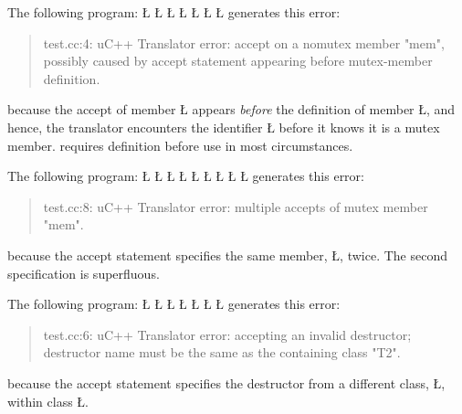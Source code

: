 \documentclass[openright,twoside]{report}
\begin{document}
The following program:
\LGinlinefalse\LGbegin\lgrinde
\L{}
\L{\LB{}}
\L{\LB{}}
\L{\LB{}}
\L{}
\L{\LB{}}
\L{\LB{\};}}
\endlgrinde\LGend
generates this error:
\begin{quote}
\BGfont
test.cc:4: uC++ Translator error: accept on a nomutex member "mem", possibly caused by accept statement appearing before mutex-member definition.
\end{quote}
because the accept of member \LGinlinetrue\LGbegin\lgrinde\L{}\endlgrinde\LGend{} appears \emph{before} the definition of member \LGinlinetrue\LGbegin\lgrinde\L{}\endlgrinde\LGend{}, and hence, the \uC translator encounters the identifier \LGinlinetrue\LGbegin\lgrinde\L{}\endlgrinde\LGend{} before it knows it is a mutex member.
\CC requires definition before use in most circumstances.

The following program:
\LGinlinefalse\LGbegin\lgrinde
\L{}
\L{}
\L{\LB{}}
\L{}
\L{\LB{}}
\L{\LB{}}
\L{\LB{}}
\L{\LB{}}
\L{\LB{\};}}
\endlgrinde\LGend
generates this error:
\begin{quote}
\BGfont
test.cc:8: uC++ Translator error: multiple accepts of mutex member "mem".
\end{quote}
because the accept statement specifies the same member, \LGinlinetrue\LGbegin\lgrinde\L{}\endlgrinde\LGend{}, twice.
The second specification is superfluous.

The following program:
\LGinlinefalse\LGbegin\lgrinde
\L{}
\L{}
\L{}
\L{\LB{}}
\L{\LB{}}
\L{\LB{}}
\L{\LB{\};}}
\endlgrinde\LGend
generates this error:
\begin{quote}
\BGfont
test.cc:6: uC++ Translator error: accepting an invalid destructor; destructor name must be the same as the containing class "T2".
\end{quote}
because the accept statement specifies the destructor from a different class, \LGinlinetrue\LGbegin\lgrinde\L{}\endlgrinde\LGend{}, within class \LGinlinetrue\LGbegin\lgrinde\L{}\endlgrinde\LGend{}.
\end{document}
